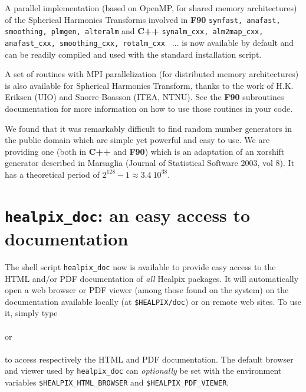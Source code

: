 \documentclass[12pt,twoside]{article}
\begin{document}
%


A parallel implementation (based on OpenMP, for shared memory architectures) of the Spherical Harmonics
Transforms involved in \textbf{F90} \texttt{synfast, anafast, smoothing, plmgen, alteralm}
and \textbf{C++}
\texttt{synalm\_cxx, alm2map\_cxx, anafast\_cxx, smoothing\_cxx, rotalm\_cxx } ... is now
available by default and can be readily compiled and used with the standard installation script. 

A set of routines with MPI parallelization (for distributed memory architectures)
 is also available for Spherical Harmonics Transform, thanks to the work of H.K. Eriksen
 (UIO) and Snorre Boasson (ITEA, NTNU). See the \textbf{F90}
 subroutines documentation for more information on how to use those routines in
 your code.

We found that it was remarkably difficult to find 
random number generators in the public
domain which are simple yet
powerful and easy to use. 
We are providing one (both in \textbf{C++} and \textbf{F90}) which is an adaptation of an xorshift generator described
 in Marsaglia (Journal of Statistical Software 2003, vol 8). It has a theoretical period of $2^{128}-1 \approx 3.4\ 10^{38}$.



\section{\texttt{healpix\_doc}: an easy access to \healpix documentation}
The shell script \texttt{healpix\_doc} now is available to provide easy
access to the HTML and/or PDF documentation of {\em all} Healpix packages.
It will automatically open a web browser or PDF viewer (among those found on the
system) on the documentation
available locally (at \texttt{\$HEALPIX/doc}) or on remote web sites. To use it, simply type\\
 \\
or \\
\\
to access respectively the HTML and PDF documentation. The default browser and
viewer used by \texttt{healpix\_doc} can {\em optionally} be set with the
environment variables
\texttt{\$HEALPIX\_HTML\_BROWSER} and
\texttt{\$HEALPIX\_PDF\_VIEWER}.
\end{document}
